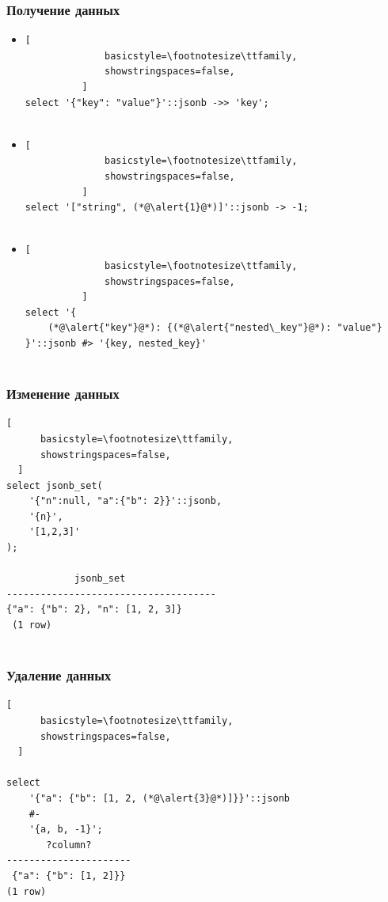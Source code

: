 \documentclass[14pt, compress, aspectratio=169]{beamer}
\begin{document}
\begin{frame}[fragile]
  \frametitle{Получение данных}

  \begin{itemize}
      \item
          \begin{lstlisting}[
              basicstyle=\footnotesize\ttfamily,
              showstringspaces=false,
          ]
select '{"key": "value"}'::jsonb ->> 'key';
         
          \end{lstlisting}

      \item
          \begin{lstlisting}[
              basicstyle=\footnotesize\ttfamily,
              showstringspaces=false,
          ]
select '["string", (*@\alert{1}@*)]'::jsonb -> -1;
         
          \end{lstlisting}

      \item
          \begin{lstlisting}[
              basicstyle=\footnotesize\ttfamily,
              showstringspaces=false,
          ]
select '{
    (*@\alert{"key"}@*): {(*@\alert{"nested\_key"}@*): "value"}
}'::jsonb #> '{key, nested_key}'
         
          \end{lstlisting}

  \end{itemize}

\end{frame}

\begin{frame}[fragile]
  \frametitle{Изменение данных}

  \begin{lstlisting}[
      basicstyle=\footnotesize\ttfamily,
      showstringspaces=false,
  ]
select jsonb_set(
    '{"n":null, "a":{"b": 2}}'::jsonb,
    '{n}',
    '[1,2,3]'
);

            jsonb_set                                 
-------------------------------------
{"a": {"b": 2}, "n": [1, 2, 3]}
 (1 row)
 
  \end{lstlisting}

\end{frame}

\begin{frame}[fragile]
  \frametitle{Удаление данных}

  \begin{lstlisting}[
      basicstyle=\footnotesize\ttfamily,
      showstringspaces=false,
  ]

select 
    '{"a": {"b": [1, 2, (*@\alert{3}@*)]}}'::jsonb
    #-
    '{a, b, -1}';
       ?column?       
----------------------
 {"a": {"b": [1, 2]}}
(1 row)

  \end{lstlisting}
\end{frame}
\end{document}
